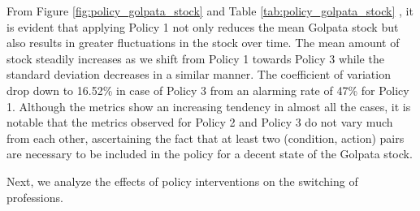 \documentclass[final,5p,times,twocolumn,authoryear]{elsarticle}
\begin{document}
From Figure \ref{fig:policy_golpata_stock} and Table \ref{tab:policy_golpata_stock} , it is evident that applying Policy 1 not only reduces the mean Golpata stock but also results in greater fluctuations in the stock over time. The mean amount of stock steadily increases as we shift from Policy 1 towards Policy 3 while the standard deviation decreases in a similar manner. The coefficient of variation drop down to 16.52\% in case of Policy 3 from an alarming rate of 47\% for Policy 1. Although the metrics show an increasing tendency in almost all the cases, it is notable that the metrics observed for Policy 2 and Policy 3 do not vary much from each other, ascertaining the fact that at least two (condition, action) pairs are necessary to be included in the policy for a decent state of the Golpata stock. 

Next, we analyze the effects of policy interventions on the switching of professions.
\end{document}
